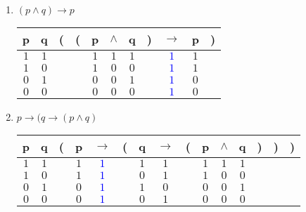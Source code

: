 \begin{problem}[7]
\begin{enumerate}
\item \textbf{$(p ∧ q) → p$}

\begin{center}
\begin{tabular}{|@{ }c@{ }@{ }c | c@{}@{}c@{}@{ }c@{ }@{ }c@{ }@{ }c@{ }@{}c@{}@{ }c@{ }@{ }c@{ }@{}c@{ }|}\hline
p & q & ( & ( & p & $\wedge$ & q & ) & $\rightarrow$ & p & )\\
\hline
$1$ & $1$ &  &  & $1$ & $1$ & $1$ &  & \textcolor{blue}{$1$} & $1$ & \\\hline
$1$ & $0$ &  &  & $1$ & $0$ & $0$ &  & \textcolor{blue}{$1$} & $1$ & \\\hline
$0$ & $1$ &  &  & $0$ & $0$ & $1$ &  & \textcolor{blue}{$1$} & $0$ & \\\hline
$0$ & $0$ &  &  & $0$ & $0$ & $0$ &  & \textcolor{blue}{$1$} & $0$ & \\\hline
\end{tabular}
\end{center}

\item \textbf{$p → (q → (p ∧ q)$}
\begin{center}
\begin{tabular}{|@{ }c@{ }@{ }c | c@{}@{ }c@{ }@{ }c@{ }@{}c@{}@{ }c@{ }@{ }c@{ }@{}c@{}@{ }c@{ }@{ }c@{ }@{ }c@{ }@{}c@{}@{}c@{}@{}c@{ }|}\hline
p & q & ( & p & $\rightarrow$ & ( & q & $\rightarrow$ & ( & p & $\wedge$ & q & ) & ) & )\\
\hline
$1$ & $1$ &  & $1$ & \textcolor{blue}{$1$} &  & $1$ & $1$ &  & $1$ & $1$ & $1$ &  &  & \\\hline
$1$ & $0$ &  & $1$ & \textcolor{blue}{$1$} &  & $0$ & $1$ &  & $1$ & $0$ & $0$ &  &  & \\\hline
$0$ & $1$ &  & $0$ & \textcolor{blue}{$1$} &  & $1$ & $0$ &  & $0$ & $0$ & $1$ &  &  & \\\hline
$0$ & $0$ &  & $0$ & \textcolor{blue}{$1$} &  & $0$ & $1$ &  & $0$ & $0$ & $0$ &  &  & \\\hline
\end{tabular}
\end{center}


\end{enumerate}
\end{problem}

